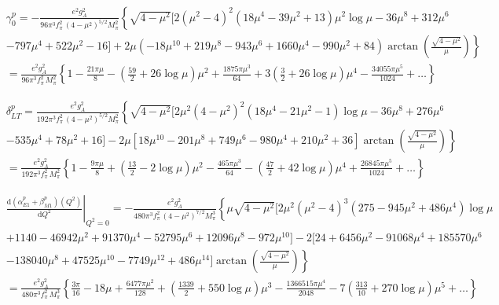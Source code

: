 \documentclass[twocolumn,prc,showpacs,nofootinbib,preprintnumbers,amsmath,amssymb,superscriptaddress]{revtex4-1}
\def\dd{\mathrm{d}}
\begin{document}
\begin{widetext}
\begin{align}
&\gamma_0^p = -\frac{e^2 g_A^2}{96\pi^3 f_\pi^2\,  (4-\mu^2)^{5/2} M_\pi^2} \left\{ \sqrt{4-\mu^2} [ 2(\mu^2-4)^2(18 \mu^4 - 39 \mu^2 +13) \mu^2 \log\mu -36 \mu^8 + 312 \mu^6\right. \nonumber\\
&\left.-797\mu^4 +522 \mu^2-16 ] + 2 \mu (-18 \mu^{10} + 219 \mu^8 -943 \mu^6+1660 \mu^4 -990 \mu^2 + 84) \arctan\left( \frac{\sqrt{4-\mu^2}}{\mu}\right) \right\}\nonumber \\
&=\frac{e^2 g_A^2}{96\pi^3 f_\pi^2\,  M_\pi^2}\left\{ 1-\frac{21\pi \mu}{8} - \left(\frac{59}{2} + 26 \log\mu\right)\mu^2 + \frac{1875 \pi \mu^3}{64} + 3\left(\frac{3}{2} + 26 \log\mu\right)\mu^4- \frac{34055 \pi \mu^5}{1024} + \dots \right\}
\end{align}

\begin{align}
&\delta^p_{LT} = \frac{e^2 g_A^2}{192\pi^3 f_\pi^2\, (4-\mu^2)^{5/2} M_\pi^2} \left\{ \sqrt{4-\mu^2} [ 2 \mu^2 (4-\mu^2)^2 (18 \mu^4-21 \mu^2-1) \log\mu -36 \mu^8 + 276 \mu^6 \nonumber \right.\\
&\left. -535 \mu^4+78 \mu^2 +16 ] - 2 \mu [18 \mu^{10} - 201 \mu^8 + 749 \mu^6 -980 \mu^4 +210 \mu^2 +36] \arctan\left( \frac{\sqrt{4-\mu^2}}{\mu} \right)      \right\}\nonumber \\
&=\frac{e^2 g_A^2}{192\pi^3 f_\pi^2\, M_\pi^2} \left\{ 1 - \frac{9 \pi \mu}{8} + \left(\frac{13}{2}-2\log\mu\right)\mu^2 - \frac{465 \pi \mu^3}{64} - \left(\frac{47}{2}+ 42 \log\mu\right)\mu^4  + \frac{26845 \pi \mu^5}{1024} + \dots\right\} 
\end{align}


\begin{align}
&\left.\frac{\dd(\alpha_{E1}^p+\beta_{M1}^p) (Q^2)}{\dd Q^2}\right|_{Q^2=0}=-\frac{e^2 g_A^2}{480 \pi^3 f_\pi^2\,  (4-\mu^2)^{7/2} M_\pi^3}\left\{ \mu\sqrt{4-\mu^2} [2\mu^2 (\mu^2-4)^3 (275-945 \mu^2 +486 \mu^4) \log\mu \right. \nonumber \\
&+1140-46942 \mu^2 + 91370 \mu^4-52795 \mu^6 +12096 \mu^8 -972 \mu^{10} ]  -2 [24 +6456\mu^2 -91068 \mu^4 +185570 \mu^6 \nonumber\\
&\left.-138040 \mu^8 +47525\mu^{10} -7749\mu^{12} +486 \mu^{14}] \arctan\left( \frac{\sqrt{4-\mu^2}}{\mu}\right) \right\} \nonumber \\
&= \frac{e^2 g_A^2}{480 \pi^3 f_\pi^2\,  M_\pi^3} \left\{  \frac{3 \pi}{16} -18 \mu + \frac{6477 \pi \mu^2}{128} + \left( \frac{1339}{2} + 550 \log\mu\right)\mu^3 -\frac{1366515 \pi \mu^4}{2048} -7\left( \frac{313}{10} + 270 \log\mu  \right)\mu^5 +\dots  \right\}
\end{align}



\end{widetext}
\end{document}
